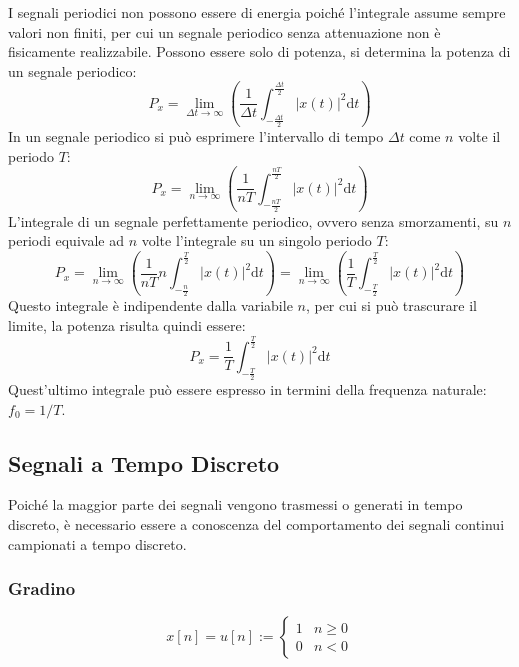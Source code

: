\documentclass{article}
\newcommand{\df}{\mathrm{d}}
\numberwithin{equation}{subsection}
\begin{document}
I segnali periodici non possono essere di energia poiché l'integrale assume sempre valori non finiti, per cui un segnale periodico senza attenuazione non è fisicamente 
realizzabile. Possono essere solo di potenza, si determina la potenza di un segnale periodico:
\begin{equation*}
    P_x=\lim_{\Delta t\to\infty}\displaystyle\left(\frac{1}{\Delta t}\int_{-\frac{\Delta t}{2}}^{\frac{\Delta t}{2}}|x(t)|^2\df t\right)
\end{equation*}
In un segnale periodico si può esprimere l'intervallo di tempo $\Delta t$ come $n$ volte il periodo $T$:
\begin{equation*}
    P_x=\lim_{n\to\infty}\displaystyle\left(\frac{1}{n T}\int_{-\frac{nT}{2}}^{\frac{nT}{2}}|x(t)|^2\df t\right)
\end{equation*}
L'integrale di un segnale perfettamente periodico, ovvero senza smorzamenti, su $n$ periodi equivale ad $n$ volte l'integrale su un singolo periodo $T$:
\begin{equation*}
    P_x=\lim_{n\to\infty}\displaystyle\left(\frac{1}{n T}n\int_{-\frac{n}{2}}^{\frac{T}{2}}|x(t)|^2\df t\right)=\lim_{n\to\infty}\displaystyle\left(\frac{1}{T}\int_{-\frac{T}{2}}^{\frac{T}{2}}|x(t)|^2\df t\right)
\end{equation*} 
Questo integrale è indipendente dalla variabile $n$, per cui si può trascurare il limite, la potenza risulta quindi essere:
\begin{equation}
    P_x=\displaystyle\frac{1}{T}\int_{-\frac{T}{2}}^{\frac{T}{2}}|x(t)|^2\df t
\end{equation}
Quest'ultimo integrale può essere espresso in termini della frequenza naturale: $f_0={1}/{T}$. 

\subsection{Segnali a Tempo Discreto}

Poiché la maggior parte dei segnali vengono trasmessi o generati in tempo discreto, è necessario essere a conoscenza del comportamento dei segnali continui campionati a 
tempo discreto. 

\subsubsection{Gradino}

\begin{equation}
    x[n]=u[n]:=\begin{cases}
        1&n\geq0\\
        0&n<0
    \end{cases}
\end{equation}
\end{document}
